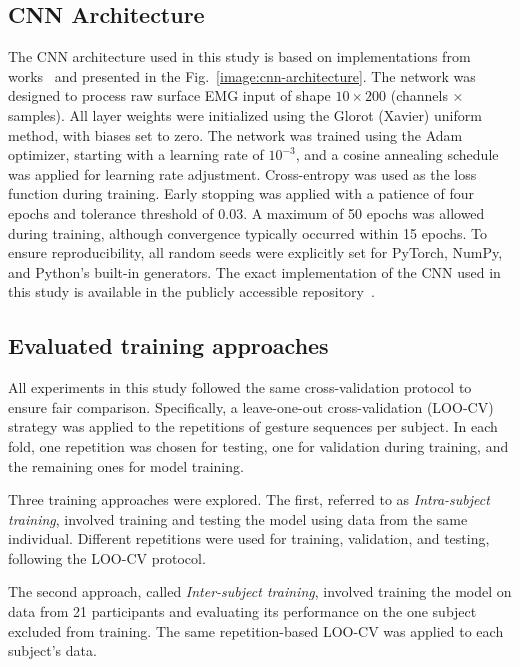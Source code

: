\begin{multicols}{2}

\subsection*{CNN Architecture}

The CNN architecture used in this study is based on implementations from works~\cite{Cote2019_3DC,LibEMG2023} and presented in the Fig.~\ref{image:cnn-architecture}. 
The network was designed to process raw surface EMG input of shape $10 \times 200$ (channels × samples).
All layer weights were initialized using the Glorot (Xavier) uniform method, with biases set to zero. The network was trained using the Adam optimizer, starting with a learning rate of $10^{-3}$, and a cosine annealing schedule was applied for learning rate adjustment. Cross-entropy was used as the loss function during training. Early stopping was applied with a patience of four epochs and tolerance threshold of 0.03. A maximum of 50 epochs was allowed during training, although convergence typically occurred within 15 epochs. To ensure reproducibility, all random seeds were explicitly set for PyTorch, NumPy, and Python’s built-in generators.
The exact implementation of the CNN used in this study is available in the publicly accessible repository~\cite{Kolomiiets2025}.

\subsection*{Evaluated training approaches}

All experiments in this study followed the same cross-validation protocol to ensure fair comparison. Specifically, a leave-one-out cross-validation (LOO-CV) strategy was applied to the repetitions of gesture sequences per subject. In each fold, one repetition was chosen for testing, one for validation during training, and the remaining ones for model training.

Three training approaches were explored. The first, referred to as \textit{Intra-subject training}, involved training and testing the model using data from the same individual. Different repetitions were used for training, validation, and testing, following the LOO-CV protocol.

The second approach, called \textit{Inter-subject training}, involved training the model on data from 21 participants and evaluating its performance on the one subject excluded from training. The same repetition-based LOO-CV was applied to each subject's data.


\end{multicols}
